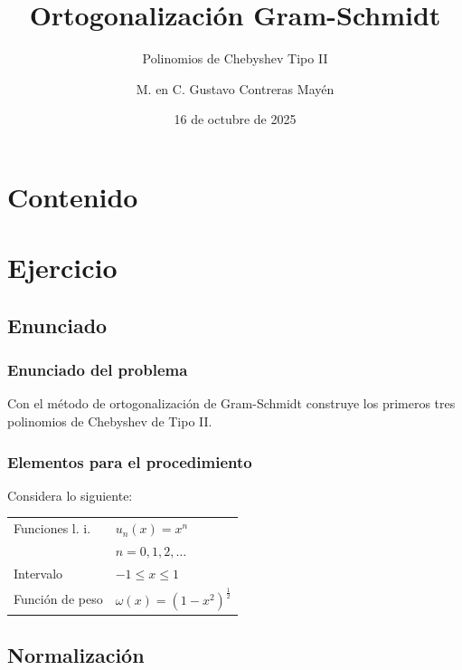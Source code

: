 \documentclass[12pt]{beamer}
\date{16 de octubre de 2025}
\title{\large{Ortogonalización Gram-Schmidt}}
\subtitle{Polinomios de Chebyshev Tipo II}
\author{M. en C. Gustavo Contreras Mayén}
\begin{document}
\maketitle
\fontsize{14}{14}\selectfont
{}

\section*{Contenido}

\section{Ejercicio}
\subsection{Enunciado}

\begin{frame}
\frametitle{Enunciado del problema}
Con el método de ortogonalización de Gram-Schmidt construye los primeros tres polinomios de Chebyshev de Tipo II.
\end{frame}
\begin{frame}
\frametitle{Elementos para el procedimiento}
Considera lo siguiente:
\pause
\begin{table}
\begin{tabular}{l l}
Funciones l. i. & $u_{n}(x) = x^{n}$ \\
 & $n = 0, 1, 2, \ldots$ \\ \pause
Intervalo & $-1 \leq x \leq 1$ \\ \pause
Función de peso & $\omega (x) = (1 -x^{2})^{\frac{1}{2}}$
\end{tabular}
\end{table}
\end{frame}

\subsection{Normalización}
\end{document}
